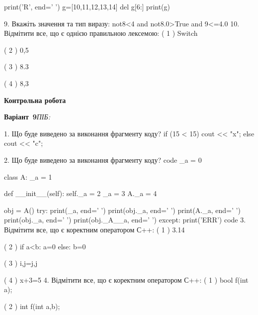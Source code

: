 \documentclass[11pt]{article}
\begin{document}
print('R', end=' ')
g=[10,11,12,13,14]
del g[6:]
print(g)

\vspace{5mm}
9. 
Вкажіть значення та тип виразу:
not8<4 and not8.0>True and 9<=4.0
\vspace{5mm}
10. %
Відмітити все, що є однією правильною лексемою:
( 1 ) Switch

( 2 ) 0,5

( 3 ) 8.3

( 4 ) 8,3
\vspace{5mm}










\newpage

\newpage

{\large\textbf{Контрольна робота}}

\textbf{Варіант \No\,9}\hfill \textit{ПІБ:}\,\underline{\hspace{60mm}}
\vspace{4mm}

1. Що буде виведено за виконання фрагменту коду?
if (15 < 15)
    cout << "x";
else
    cout << "c";

\vspace{5mm}
2. Що буде виведено за виконання фрагменту коду?
code
_a = 0

class A:
    _a = 1
    
    def __init__(self):
        self._a = 2
        _a = 3
        A._a = 4

obj = A()
try:
    print(_a, end=' ')
    print(obj._a, end=' ')
    print(A._a, end=' ')
    print(obj._a, end=' ')
    print(obj._A__a, end=' ')
except:
    print('ERR')
code
\vspace{5mm}
3. %
Відмітити все, що є коректним оператором С++:
( 1 ) 3.14%

( 2 ) if a<b: a=0 else: b=0

( 3 ) i,j=j,j

( 4 ) x+3=5
\vspace{5mm}
4. %
Відмітити все, що є коректним оператором С++:
( 1 ) bool f(int a);

( 2 ) int f(int a,b);
\end{document}
